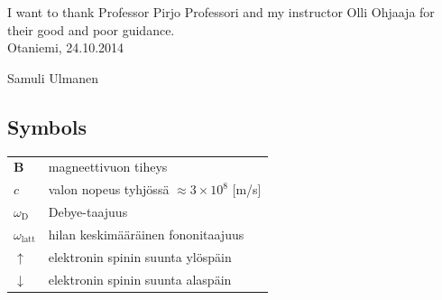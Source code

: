 \documentclass[english,12pt,a4paper,pdftex,elec,utf8]{aaltothesis}
\begin{document}
I want to thank Professor Pirjo Professori
and my instructor Olli Ohjaaja for their
good and poor guidance.\\

\vspace{5cm}
Otaniemi, 24.10.2014

\vspace{5mm}
{\hfill Samuli Ulmanen \hspace{1cm}}

\newpage


\thesistableofcontents


\subsection*{Symbols}

\begin{tabular}{ll}
$\mathbf{B}$  & magneettivuon tiheys  \\
$c$              & valon nopeus tyhj\"oss\"a $\approx 3\times10^8$ [m/s]\\
$\omega_{\mathrm{D}}$    & Debye-taajuus \\
$\omega_{\mathrm{latt}}$ & hilan keskim\"a\"ar\"ainen fononitaajuus \\
$\uparrow$       & elektronin spinin suunta yl\"osp\"ain\\
$\downarrow$     & elektronin spinin suunta alasp\"ain
\end{tabular}
\end{document}
